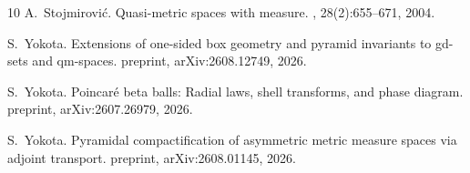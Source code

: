 \documentclass{amsart}
\numberwithin{equation}{section}
\theoremstyle{plain}
\theoremstyle{definition}
\theoremstyle{remark}
\begin{document}
\begin{thebibliography}{10}
A.~Stojmirovi{\'c}.
\newblock Quasi-metric spaces with measure.
, 28(2):655--671, 2004.

S.~Yokota.
\newblock Extensions of one-sided box geometry and pyramid invariants to
  gd-sets and qm-spaces.
\newblock preprint, arXiv:2608.12749, 2026.

S.~Yokota.
\newblock Poincar\'e beta balls: Radial laws, shell transforms, and phase
  diagram.
\newblock preprint, arXiv:2607.26979, 2026.

S.~Yokota.
\newblock Pyramidal compactification of asymmetric metric measure spaces via
  adjoint transport.
\newblock preprint, arXiv:2608.01145, 2026.

\end{thebibliography}
\end{document}
